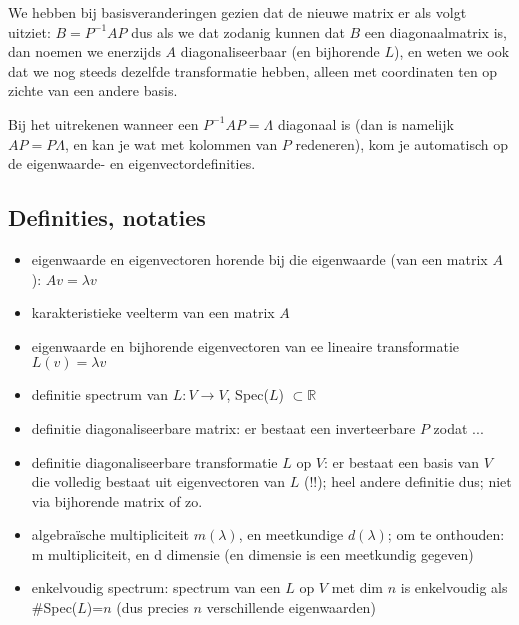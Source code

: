 \documentclass{article}
\begin{document}
We hebben bij basisveranderingen gezien dat de nieuwe matrix er als volgt uitziet: $B=P^{-1}AP$ dus als we dat zodanig kunnen dat $B$ een diagonaalmatrix is, dan noemen we enerzijds $A$ diagonaliseerbaar (en bijhorende $L$), en weten we ook dat we nog steeds dezelfde transformatie hebben, alleen met coordinaten ten op zichte van een andere basis. 

Bij het uitrekenen wanneer een $P^{-1}AP=\Lambda$ diagonaal is (dan is namelijk $AP=P\Lambda$, en kan je wat met kolommen van $P$ redeneren), kom je automatisch op de eigenwaarde- en eigenvectordefinities. 


\subsection{Definities, notaties}
\begin{itemize}
    \item eigenwaarde en eigenvectoren horende bij die eigenwaarde (van een matrix $A$): $Av=\lambda v$
    \item karakteristieke veelterm van een matrix $A$
    \item eigenwaarde en bijhorende eigenvectoren  van ee lineaire transformatie $L(v)=\lambda v$
    \item definitie spectrum van $L:V \to V$, Spec($L$) $\subset \mathbb{R}$
    \item definitie diagonaliseerbare matrix: er bestaat een inverteerbare $P$ zodat ... 
    \item definitie diagonaliseerbare transformatie $L$ op $V$: er bestaat een basis van $V$ die volledig bestaat uit eigenvectoren van $L$ (!!); heel andere definitie dus; niet via bijhorende matrix of zo. 
    \item algebra\"ische multipliciteit  $m(\lambda)$, en meetkundige $d(\lambda) $; om te onthouden: m multipliciteit, en d dimensie (en dimensie is een meetkundig gegeven) 
    \item enkelvoudig spectrum: spectrum van een $L$ op $V$ met dim $n$ is enkelvoudig als \#Spec($L$)=$n$ (dus precies $n$ verschillende eigenwaarden) 
\end{itemize}
\end{document}
